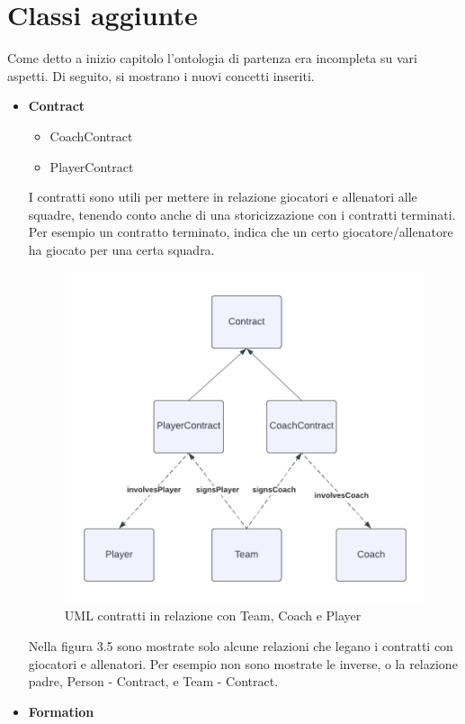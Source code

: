 \documentclass[11pt]{report} %
\begin{document}
\newpage


 \section{Classi aggiunte}

Come detto a inizio capitolo l'ontologia di partenza era incompleta su vari aspetti. Di seguito, si mostrano i nuovi concetti inseriti.

\begin{itemize}[leftmargin=*]
  \item \textbf{Contract}
  \begin{itemize}[leftmargin=2em]
    \item CoachContract
    \item PlayerContract
  \end{itemize}

  I contratti sono utili per mettere in relazione giocatori e allenatori alle squadre, tenendo conto anche di una storicizzazione con i contratti terminati. Per esempio un contratto terminato, indica che un certo giocatore/allenatore ha giocato per una certa squadra.
  
\begin{figure}[H]
    \centering
    \includegraphics[width=0.8\linewidth]{CONTRACT.png}
    \caption{UML contratti in relazione con Team, Coach e Player}
\end{figure}

Nella figura 3.5 sono mostrate solo alcune relazioni che legano i contratti con giocatori e allenatori. Per esempio non sono mostrate le inverse, o la relazione padre,  Person - Contract, e Team - Contract. 
\newpage
  \item \textbf{Formation}
  

\end{itemize}
\end{document}
